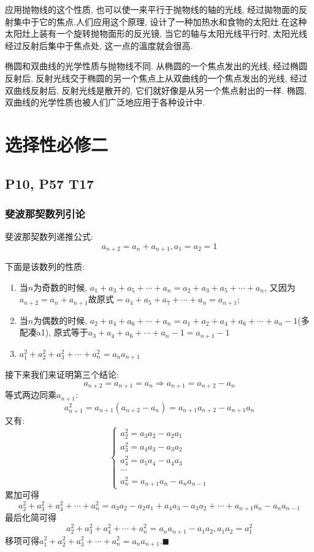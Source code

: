 \documentclass{book}
\begin{document}
    应用抛物线的这个性质, 也可以使一来平行于抛物线的轴的光线, 经过拋物面的反射集中于它的焦点.人们应用这个原理, 设计了一种加热水和食物的太阳灶.在这种太阳灶上装有一个旋转抛物面形的反光镜, 当它的轴与太阳光线平行时, 太阳光线经过反射后集中于焦点处, 这一点的溫度就会很高.

    椭圆和双曲线的光学性质与抛物线不同. 从椭圆的一个焦点发出的光线, 经过椭圆反射后, 反射光线交于椭圆的另一个焦点上从双曲线的一个焦点发出的光线, 经过双曲线反射后, 反射光线是散开的, 它们就好像是从另一个焦点射出的一样. 椭圆, 双曲线的光学性质也被人们广泛地应用于各种设计中.

    \chapter{选择性必修二}
    
    \section{\textcolor[rgb]{0.11,0.65,0.52}{P10, P57 T17}}
    \subsection{斐波那契数列引论}
    \textcolor[rgb]{0.38,0.11,0.2}{斐波那契数列}递推公式:$$a_{n+2}=a_n+a_{n+1},a_1=a_2=1$$

    下面是该数列的性质:

    \begin{enumerate}
        \item 当$n$为奇数的时候, $a_1+a_3+a_5+\cdots+a_n=a_2+a_3+a_5+\cdots+a_n$, 又因为$a_{n+2}=a_n+a_{n+1}$故原式$=a_4+a_5+a_7+\cdots+a_n=a_{n+1}$;
        \item 当$n$为偶数的时候, $a_2+a_4+a_6+\cdots+a_n=a_1+a_2+a_4+a_6+\cdots+a_n-1$(多配凑a1), 原式等于$a_3+a_4+a_6+\cdots+a_n-1=a_{n+1}-1$
        \item $\displaystyle a_1^2+a_2^2+a_3^2+\cdots+a_n^2=a_na_{n+1}$
    \end{enumerate}

    接下来我们来证明第三个结论:
    $$a_{n+2}=a_{n+1}=a_n\Longrightarrow a_{n+1}=a_{n+2}-a_n$$
    等式两边同乘$a_{n+1}$:$$a_{n+1}^2=a_{n+1}\left( a_{n+2}-a_n \right)=a_{n+1}a_{n+2}-a_{n+1}a_n$$
    又有:$$\left\{\begin{matrix} 
        a_2^2=a_3a_2-a_2a_1 \\  
        a_3^2=a_4a_3-a_3a_2 \\
        a_4^2=a_5a_4-a_4a_3 \\
        \cdots \\
        a_n^2=a_{n+1}a_n-a_{n}a_{n-1}
      \end{matrix}\right. $$
    累加可得$$a_2^2+a_3^2+a_4^2+\cdots+a_n^2=a_3a_2-a_2a_1+a_4a_3-a_3a_2+\cdots+a_{n+1}a_n-a_{n}a_{n-1}$$
    最后化简可得$$a_2^2+a_3^2+a_4^2+\cdots+a_n^2=a_na_{n+1}-a_1a_2,a_1a_2=a_1^2$$
    移项可得$\displaystyle a_1^2+a_2^2+a_3^2+\cdots+a_n^2=a_na_{n+1}. \blacksquare$
\end{document}
